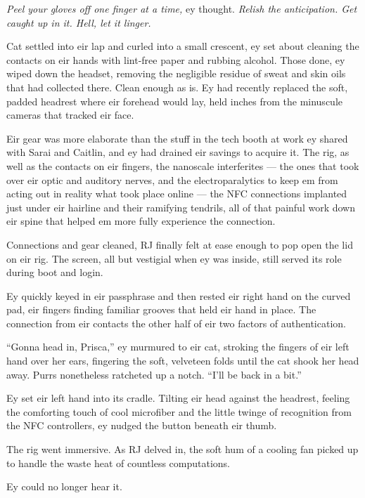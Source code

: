 \emph{Peel your gloves off one finger at a time,} ey thought. \emph{Relish the anticipation. Get caught up in it. Hell, let it linger.}

Cat settled into eir lap and curled into a small crescent, ey set about cleaning the contacts on eir hands with lint-free paper and rubbing alcohol. Those done, ey wiped down the headset, removing the negligible residue of sweat and skin oils that had collected there. Clean enough as is. Ey had recently replaced the soft, padded headrest where eir forehead would lay, held inches from the minuscule cameras that tracked eir face.

Eir gear was more elaborate than the stuff in the tech booth at work ey shared with Sarai and Caitlin, and ey had drained eir savings to acquire it. The rig, as well as the contacts on eir fingers, the nanoscale interferites --- the ones that took over eir optic and auditory nerves, and the electroparalytics to keep em from acting out in reality what took place online --- the NFC connections implanted just under eir hairline and their ramifying tendrils, all of that painful work down eir spine that helped em more fully experience the connection.

Connections and gear cleaned, RJ finally felt at ease enough to pop open the lid on eir rig. The screen, all but vestigial when ey was inside, still served its role during boot and login.

Ey quickly keyed in eir passphrase and then rested eir right hand on the curved pad, eir fingers finding familiar grooves that held eir hand in place. The connection from eir contacts the other half of eir two factors of authentication.

``Gonna head in, Prisca,'' ey murmured to eir cat, stroking the fingers of eir left hand over her ears, fingering the soft, velveteen folds until the cat shook her head away. Purrs nonetheless ratcheted up a notch. ``I'll be back in a bit.''

Ey set eir left hand into its cradle. Tilting eir head against the headrest, feeling the comforting touch of cool microfiber and the little twinge of recognition from the NFC controllers, ey nudged the button beneath eir thumb.

The rig went immersive. As RJ delved in, the soft hum of a cooling fan picked up to handle the waste heat of countless computations.

Ey could no longer hear it.
